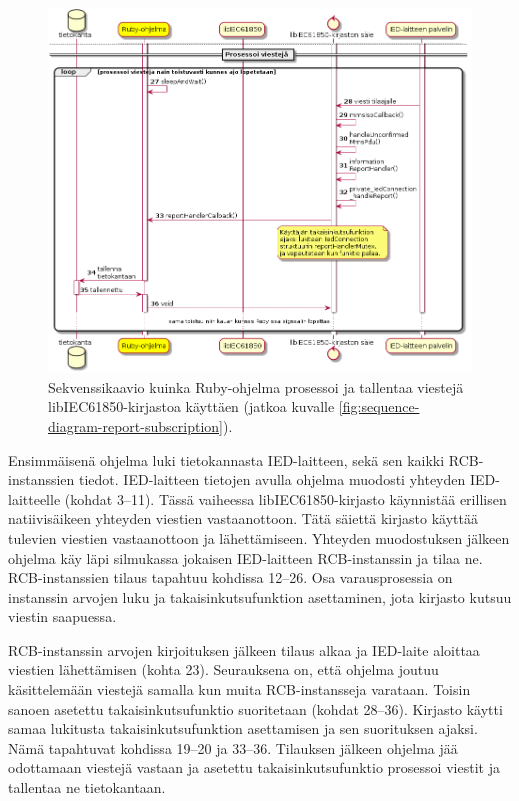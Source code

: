 \begin{figure}
	\includegraphics[width=1\textwidth]{pictures/sequence-diagram-report-subscription_001.png}
	\caption{Sekvenssikaavio kuinka Ruby-ohjelma prosessoi ja tallentaa viestejä libIEC61850-kirjastoa käyttäen (jatkoa kuvalle \ref{fig:sequence-diagram-report-subscription}).}
	\label{fig:sequence-diagram-report-subscription-processing}
\end{figure}

Ensimmäisenä ohjelma luki tietokannasta IED-laitteen, sekä sen kaikki RCB-instanssien tiedot. IED-laitteen tietojen avulla ohjelma muodosti yhteyden IED-laitteelle (kohdat 3--11). Tässä vaiheessa libIEC61850-kirjasto käynnistää erillisen natiivisäikeen yhteyden viestien vastaanottoon. Tätä säiettä kirjasto käyttää tulevien viestien vastaanottoon ja lähettämiseen. Yhteyden muodostuksen jälkeen ohjelma käy läpi silmukassa jokaisen IED-laitteen RCB-instanssin ja tilaa ne. RCB-instanssien tilaus tapahtuu kohdissa 12--26. Osa varausprosessia on instanssin arvojen luku ja takaisinkutsufunktion asettaminen, jota kirjasto kutsuu viestin saapuessa. \mbox{\cite{libIEC61850-repo}}

RCB-instanssin arvojen kirjoituksen jälkeen tilaus alkaa ja IED-laite aloittaa viestien lähettämisen (kohta 23). Seurauksena on, että ohjelma joutuu käsittelemään viestejä samalla kun muita RCB-instansseja varataan. Toisin sanoen asetettu takaisinkutsufunktio suoritetaan (kohdat 28--36). Kirjasto käytti samaa lukitusta takaisinkutsufunktion asettamisen ja sen suorituksen ajaksi. Nämä tapahtuvat kohdissa 19--20 ja 33--36. Tilauksen jälkeen ohjelma jää odottamaan viestejä vastaan ja asetettu takaisinkutsufunktio prosessoi viestit ja tallentaa ne tietokantaan. \mbox{\cite{libIEC61850-repo}}


